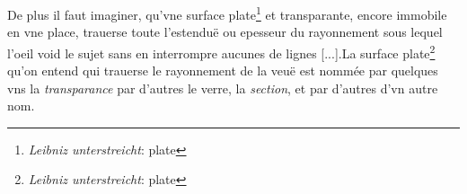 \pend \pstart [p.~45] De plus il faut imaginer, qu'vne surface plate\footnote{\textit{Leibniz unterstreicht}: plate} et transparante, encore immobile en vne place, trauerse toute l'estenduë ou epesseur du rayonnement sous lequel l'oeil\protect{} void le sujet sans en interrompre aucunes de lignes [...].\pend \pstart  La surface plate\footnote{\textit{Leibniz unterstreicht}: plate} qu'on entend qui trauerse le rayonnement de la veuë est nomm\'{e}e par quelques vns la \textit{transparance} par d'autres le verre\protect{}, la \textit{section}, et par d'autres d'vn autre nom.